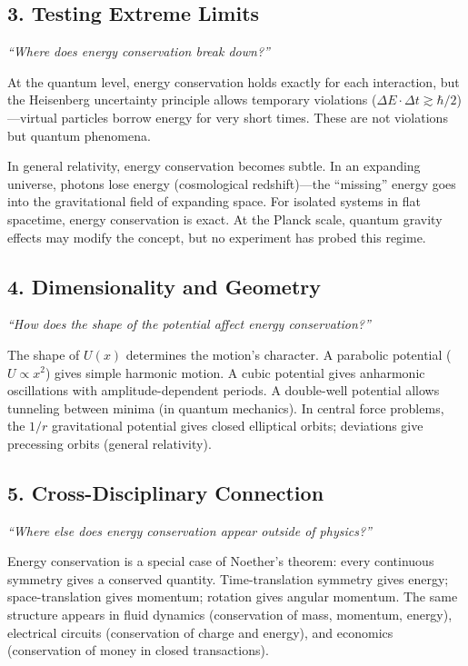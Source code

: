 \documentclass[11pt,openright]{book}
\begin{document}
\subsection*{3. Testing Extreme Limits}
\textit{``Where does energy conservation break down?''}

At the quantum level, energy conservation holds exactly for each interaction, but the Heisenberg uncertainty principle allows temporary violations ($\Delta E \cdot \Delta t \gtrsim \hbar/2$)---virtual particles borrow energy for very short times. These are not violations but quantum phenomena.

In general relativity, energy conservation becomes subtle. In an expanding universe, photons lose energy (cosmological redshift)---the ``missing'' energy goes into the gravitational field of expanding space. For isolated systems in flat spacetime, energy conservation is exact. At the Planck scale, quantum gravity effects may modify the concept, but no experiment has probed this regime.

\subsection*{4. Dimensionality and Geometry}
\textit{``How does the shape of the potential affect energy conservation?''}

The shape of $U(x)$ determines the motion's character. A parabolic potential ($U \propto x^2$) gives simple harmonic motion. A cubic potential gives anharmonic oscillations with amplitude-dependent periods. A double-well potential allows tunneling between minima (in quantum mechanics). In central force problems, the $1/r$ gravitational potential gives closed elliptical orbits; deviations give precessing orbits (general relativity).

\subsection*{5. Cross-Disciplinary Connection}
\textit{``Where else does energy conservation appear outside of physics?''}

Energy conservation is a special case of Noether's theorem: every continuous symmetry gives a conserved quantity. Time-translation symmetry gives energy; space-translation gives momentum; rotation gives angular momentum. The same structure appears in fluid dynamics (conservation of mass, momentum, energy), electrical circuits (conservation of charge and energy), and economics (conservation of money in closed transactions).
\end{document}
